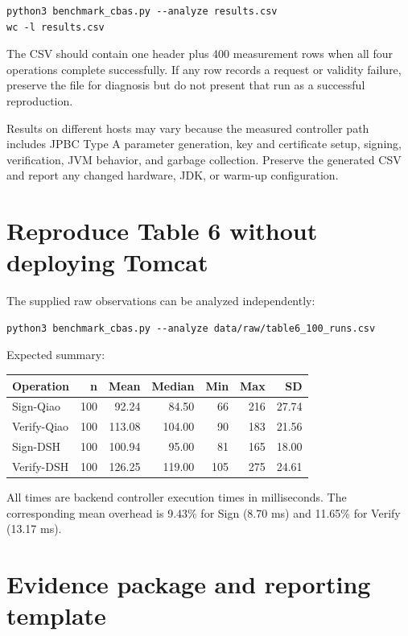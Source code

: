 \documentclass[11pt,a4paper]{article}
\begin{document}
\begin{lstlisting}[style=terminal]
python3 benchmark_cbas.py --analyze results.csv
wc -l results.csv
\end{lstlisting}

The CSV should contain one header plus 400 measurement rows when all four operations complete successfully. If any row records a request or validity failure, preserve the file for diagnosis but do not present that run as a successful reproduction.

Results on different hosts may vary because the measured controller path includes JPBC Type A parameter generation, key and certificate setup, signing, verification, JVM behavior, and garbage collection. Preserve the generated CSV and report any changed hardware, JDK, or warm-up configuration.

\section{Reproduce Table 6 without deploying Tomcat}

The supplied raw observations can be analyzed independently:

\begin{lstlisting}[style=terminal]
python3 benchmark_cbas.py --analyze data/raw/table6_100_runs.csv
\end{lstlisting}

Expected summary:

\begin{tabularx}{\linewidth}{@{}Xrrrrrr@{}}
\toprule
\textbf{Operation} & \textbf{n} & \textbf{Mean} & \textbf{Median} & \textbf{Min} & \textbf{Max} & \textbf{SD} \\
\midrule
Sign-Qiao & 100 & 92.24 & 84.50 & 66 & 216 & 27.74 \\
Verify-Qiao & 100 & 113.08 & 104.00 & 90 & 183 & 21.56 \\
Sign-DSH & 100 & 100.94 & 95.00 & 81 & 165 & 18.00 \\
Verify-DSH & 100 & 126.25 & 119.00 & 105 & 275 & 24.61 \\
\bottomrule
\end{tabularx}

All times are backend controller execution times in milliseconds. The corresponding mean overhead is 9.43\% for Sign (8.70 ms) and 11.65\% for Verify (13.17 ms).

\section{Evidence package and reporting template}
\end{document}

